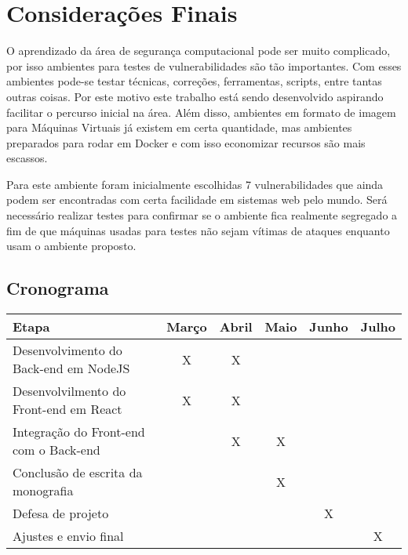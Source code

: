 \chapter{Considerações Finais}

O aprendizado da área de segurança computacional pode ser muito complicado, por isso ambientes para testes de vulnerabilidades são tão importantes. Com esses ambientes pode-se testar técnicas, correções, ferramentas, scripts, entre tantas outras coisas. Por este motivo este trabalho está sendo desenvolvido aspirando facilitar o percurso inicial na área. Além disso, ambientes em formato de imagem para Máquinas Virtuais já existem em certa quantidade, mas ambientes preparados para rodar em Docker e com isso economizar recursos são mais escassos.

Para este ambiente foram inicialmente escolhidas 7 vulnerabilidades que ainda podem ser encontradas com certa facilidade em sistemas web pelo mundo. Será necessário realizar testes para confirmar se o ambiente fica realmente segregado a fim de que máquinas usadas para testes não sejam vítimas de ataques enquanto usam o ambiente proposto.

\section{Cronograma}

\begin{center}
\begin{table}[!htb]
\begin{tabular}{|l|l|l|l|l|l|}
\hline
Etapa                                  & Março                  & Abril                  & Maio                   & Junho                  & Julho                  \\ \hline
Desenvolvimento do Back-end em NodeJS  & \multicolumn{1}{c|}{X} & \multicolumn{1}{c|}{X} &                        &                        &                        \\ \hline
Desenvolvilmento do Front-end em React & \multicolumn{1}{c|}{X} & \multicolumn{1}{c|}{X} &                        &                        &                        \\ \hline
Integração do Front-end com o Back-end &                        & \multicolumn{1}{c|}{X} & \multicolumn{1}{c|}{X} &                        &                        \\ \hline
Conclusão de escrita da monografia     &                        &                        & \multicolumn{1}{c|}{X} &                        &                        \\ \hline
Defesa de projeto                      &                        &                        &                        & \multicolumn{1}{c|}{X} &                        \\ \hline
Ajustes e envio final                  &                        &                        &                        &                        & \multicolumn{1}{c|}{X} \\ \hline
\end{tabular}
\end{table}
\end{center}